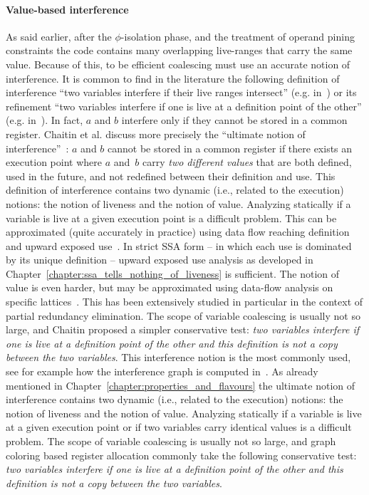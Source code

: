 \paragraph{Value-based interference}
\label{par:alternative_ssa_destruction:value}
As said earlier, after the $\phi$-isolation phase, and the treatment of operand pining constraints the code contains many overlapping live-ranges that carry the same value. Because of this, to be efficient coalescing must use an accurate notion of interference.
\ifhab
It is common to find in the literature the following definition of
  interference ``two variables interfere if their live ranges intersect''
  (e.g.  in~\cite{George96,liverange.pldi02,SmithRH04}) or its refinement ``two variables interfere if one is live at a definition point of the other'' (e.g. in~\cite{Chaitin82}).  In fact, $a$ and $b$ interfere only if
they cannot be stored in a common register. 
Chaitin et al.  discuss more
  precisely the ``ultimate notion of interference''~\cite{Chaitin81}:
$a$ and $b$
cannot be stored in a common register if there exists an execution point where
$a$ and~$b$ carry {\em two different values} that are both defined, used in the
future, and not redefined between their definition and use.  
%
This definition of interference contains two dynamic (i.e., related to the
execution) notions: the notion of liveness and the notion of value.  
Analyzing statically if a variable is live at a given execution point is a difficult problem. 
This can be approximated (quite accurately in practice) using data
flow reaching definition and upward exposed use~\cite{appel:2002:modern}.  In
strict SSA form -- in which each use is dominated by its unique
definition -- upward exposed use analysis as developed in Chapter~\ref{chapter:ssa_tells_nothing_of_liveness} is sufficient.  The
notion of value is even harder, but may be approximated using data-flow
analysis on specific lattices~\cite{AlpernWZ88, BouchezDEA}.  This has been
extensively studied in particular in the context of partial redundancy
elimination.
The scope of variable coalescing is usually not so large, and
Chaitin proposed a simpler conservative test: \emph{two variables interfere if
  one is live at a definition point of the other and this definition is not a
  copy between the two variables}. This interference notion is the most
commonly used, see for example how the interference graph is computed
in~\cite{appel:2002:modern}.
\else
As already mentioned in Chapter~\ref{chapter:properties_and_flavours} the ultimate notion of interference contains two dynamic (i.e., related to the
execution) notions: the notion of liveness and the notion of value.  
Analyzing statically if a variable is live at a given execution point or if two variables carry identical values is a difficult problem.
The scope of variable coalescing is usually not so large, and graph coloring based register allocation commonly take the following conservative test: \emph{two variables interfere if one is live at a definition point of the other and this definition is not a copy between the two variables}.
\fi

